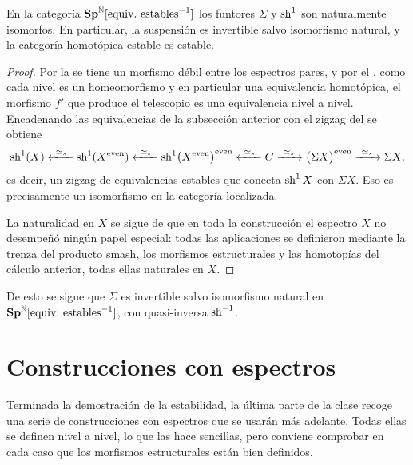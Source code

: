 \begin{teo}\label{teo:sigma-Sh}
En la categoría $\Sp^{\mathbb{N}}[\text{equiv.\ estables}^{-1}]$ los funtores $\Sigma$ y $\operatorname{sh}^1$ son naturalmente isomorfos. En particular, la suspensión es invertible salvo isomorfismo natural, y la categoría homotópica estable es estable.
\end{teo}

\begin{proof}
Por la  se tiene un morfismo débil entre los espectros pares, y por el , como cada nivel es un homeomorfismo y en particular una equivalencia homotópica, el morfismo $f'$ que produce el telescopio es una equivalencia nivel a nivel. Encadenando las equivalencias de la subsección anterior con el zigzag del  se obtiene
\[
\sh^1(X)\xleftarrow{\ \simeq_s\ }\sh^1(X^{\text{even}})\xleftarrow{\ \simeq_s\ }\sh^1\bigl(X^{\mathrm{even}}\bigr)^{\mathrm{even}}\xleftarrow{\ \simeq_s\ }C\xrightarrow{\ \simeq_s\ }\bigl(\Sigma X\bigr)^{\mathrm{even}}\xrightarrow{\ \simeq_s\ }\Sigma X,
\]
es decir, un zigzag de equivalencias estables que conecta $\operatorname{sh}^1X$ con $\Sigma X$. Eso es precisamente un isomorfismo en la categoría localizada.

La naturalidad en $X$ se sigue de que en toda la construcción el espectro $X$ no desempeñó ningún papel especial: todas las aplicaciones se definieron mediante la trenza del producto smash, los morfismos estructurales y las homotopías del cálculo anterior, todas ellas naturales en $X$. \qedhere
\end{proof}

De esto se sigue que $\Sigma$ es invertible salvo isomorfismo natural en $\Sp^{\mathbb{N}}[\text{equiv.\ estables}^{-1}]$, con quasi-inversa $\operatorname{sh}^{-1}$.

\section{Construcciones con espectros}

Terminada la demostración de la estabilidad, la última parte de la clase recoge una serie de construcciones con espectros que se usarán más adelante. Todas ellas se definen nivel a nivel, lo que las hace sencillas, pero conviene comprobar en cada caso que los morfismos estructurales están bien definidos.

